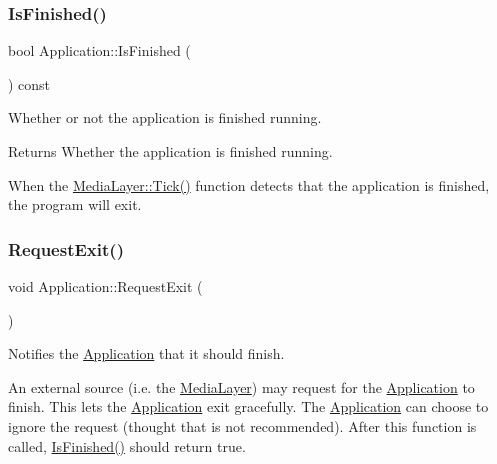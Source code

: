 \subsubsection{\texorpdfstring{Is\+Finished()}{IsFinished()}}
{\footnotesize\ttfamily bool Application\+::\+Is\+Finished (\begin{DoxyParamCaption}{ }\end{DoxyParamCaption}) const\hspace{0.3cm}{\ttfamily [virtual]}}



Whether or not the application is finished running. 

\begin{DoxyReturn}{Returns}
Whether the application is finished running.
\end{DoxyReturn}
When the \hyperlink{class_media_layer_a570ff8c3fc3e8f3e720d9dcebafba143}{Media\+Layer\+::\+Tick()} function detects that the application is finished, the program will exit. \hypertarget{class_application_a9cbe96f94653eae2bb6ad5857b00fa10}{}\label{class_application_a9cbe96f94653eae2bb6ad5857b00fa10} 
\subsubsection{\texorpdfstring{Request\+Exit()}{RequestExit()}}
{\footnotesize\ttfamily void Application\+::\+Request\+Exit (\begin{DoxyParamCaption}{ }\end{DoxyParamCaption})\hspace{0.3cm}{\ttfamily [virtual]}}



Notifies the \hyperlink{class_application}{Application} that it should finish. 

An external source (i.\+e. the \hyperlink{class_media_layer}{Media\+Layer}) may request for the \hyperlink{class_application}{Application} to finish. This lets the \hyperlink{class_application}{Application} exit gracefully. The \hyperlink{class_application}{Application} can choose to ignore the request (thought that is not recommended). After this function is called, \hyperlink{class_application_a454a1d926759c4bfac47e730570a7743}{Is\+Finished()} should return true. \hypertarget{class_application_a2eb61ca027f223a5c5ad1bf982481193}{}\label{class_application_a2eb61ca027f223a5c5ad1bf982481193} 
